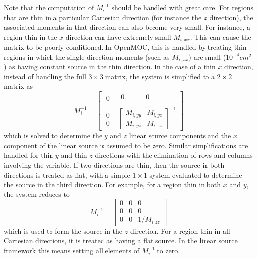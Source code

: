 Note that the computation of $M_i^{-1}$ should be handled with great care. For regions that are thin in a particular Cartesian direction (for instance the $x$ direction), the associated moments in that direction can also become very small. For instance, a region thin in the $x$ direction can have extremely small $M_{i,xx}$. This can cause the matrix to be poorly conditioned. In OpenMOC, this is handled by treating thin regions in which the single direction moments (such as $M_{i,xx}$) are small ($10^{-4} \textit{cm}^2$) as having constant source in the thin direction. In the case of a thin $x$ direction, instead of handling the full $3 \times 3$ matrix, the system is simplified to a $2 \times 2$ matrix as
\begin{equation*}
	M_i^{-1} = 
	\begin{bmatrix}
		\begin{matrix}
			0  
		\end{matrix}
			& \begin{matrix} 
			 0\phantom{M_{i,yy}}  & 0\phantom{M_{i,yz}}
			 \end{matrix} \\
	    \begin{matrix} 
	    	0 \\ 0 
		\end{matrix}
		      & \begin{bmatrix}
				M_{i,yy}  & M_{i,yz} \\
				M_{i,yz}  & M_{i,zz}
			\end{bmatrix}^{-1}
	\end{bmatrix}
\end{equation*}
which is solved to determine the $y$ and $z$ linear source components and the $x$ component of the linear source is assumed to be zero. Similar simplifications are handled for thin $y$ and thin $z$ directions with the elimination of rows and columns involving the variable. If two directions are thin, then the source in both directions is treated as flat, with a simple $1\times1$ system evaluated to determine the source in the third direction. For example, for a region thin in both $x$ and $y$, the system reduces to
\begin{equation*}
	M_i^{-1} = 
	\begin{bmatrix}
		0 & 0  & 0 \\
		0 & 0  & 0 \\
		0 & 0  & 1 / M_{i,zz}
	\end{bmatrix}
\end{equation*}
which is used to form the source in the $z$ direction. For a region thin in all Cartesian directions, it is treated as having a flat source. In the linear source framework this means setting all elements of $M_i^{-1}$ to zero.

